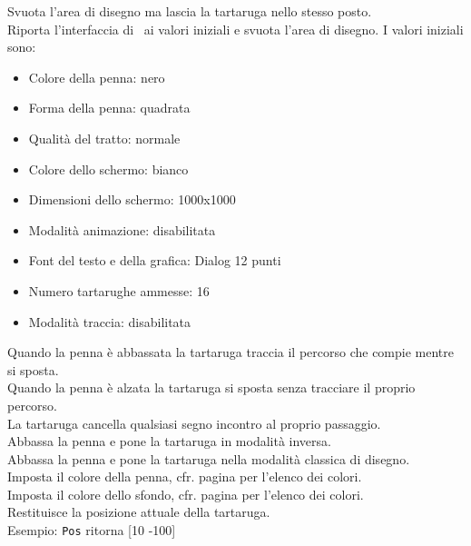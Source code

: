  Svuota l'area di disegno ma lascia la tartaruga nello stesso posto.\\

 Riporta l'interfaccia di \xlogo\ ai valori iniziali e svuota l'area di disegno. I valori iniziali sono:
\begin{itemize}
	\item Colore della penna: nero
	\item Forma della penna: quadrata
	\item Qualità del tratto: normale
	\item Colore dello schermo: bianco
	\item Dimensioni dello schermo: 1000x1000
	\item Modalità animazione: disabilitata
	\item Font del testo e della grafica: Dialog 12 punti
	\item Numero tartarughe ammesse: 16
	\item Modalità traccia: disabilitata
\end{itemize}

 Quando la penna è abbassata la tartaruga traccia il percorso che compie mentre si sposta.\\

 Quando la penna è alzata la tartaruga si sposta senza tracciare il proprio percorso.\\

 La tartaruga cancella qualsiasi segno incontro al proprio passaggio.\\

 Abbassa la penna e pone la tartaruga in modalità inversa.\\

 Abbassa la penna e pone la tartaruga nella modalità classica di disegno.\\

 Imposta il colore della penna, cfr. pagina \pageref{couleurs} per l'elenco dei colori.\\

 Imposta il colore dello sfondo, cfr. pagina \pageref{couleurs} per l'elenco dei colori.\\

 Restituisce la posizione attuale della tartaruga.\\
Esempio: \texttt{Pos} ritorna {[}10 -100{]}\\

